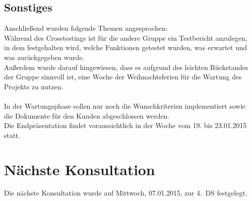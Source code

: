 \documentclass{scrartcl}
\begin{document}
\vspace{1em}

\subsection{Sonstiges}
Anschließend wurden folgende Themen angesprochen:\\
Während des Crosstestings ist für die andere Gruppe ein Testbericht anzulegen, in dem festgehalten wird, welche Funktionen getestet wurden, was erwartet und was zurückgegeben wurde.\\
Außerdem wurde darauf hingewiesen, dass es aufgrund des leichten Rückstandes der Gruppe sinnvoll ist, eine Woche der Weihnachtsferien für die Wartung des Projekts zu nutzen.\\\\
In der Wartungsphase sollen nur noch die Wunschkriterien implementiert sowie die Dokumente für den Kunden abgeschlossen werden.\\
Die Endpräsentation findet voraussichtlich in der Woche vom 19. bis 23.01.2015 statt.

\vspace{1em}

\section{Nächste Konsultation}
Die nächste Konsultation wurde auf Mittwoch, 07.01.2015, zur 4.~DS festgelegt.
\end{document}
